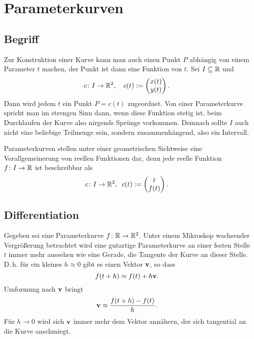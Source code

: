 \section{Parameterkurven}
\subsection{Begriff}
Zur Konstruktion einer Kurve kann man auch einen Punkt $P$ abhängig
von einem Parameter $t$ machen, der Punkt ist dann eine Funktion
von $t$. Sei $I\subseteq\mathbb R$ und%
\begin{equation}
c\colon I\to\mathbb R^2, \quad c(t):=\begin{pmatrix}x(t)\\ y(t)\end{pmatrix}.
\end{equation}
Dann wird jedem $t$ ein Punkt $P=c(t)$ zugeordnet. Von einer
Parameterkurve spricht man im strengen Sinn dann, wenn diese
Funktion stetig ist, beim Durchlaufen der Kurve also nirgends
Sprünge vorkommen. Demnach sollte $I$ auch nicht eine beliebige
Teilmenge sein, sondern zusammenhängend, also ein Intervall.

Parameterkurven stellen unter einer geometrischen Sichtweise eine
Verallgemeinerung von reellen Funktionen dar, denn jede reelle
Funktion $f\colon I\to\mathbb R$ ist beschreibbar als%
\begin{equation}
c\colon I\to \mathbb R^2,\;\; c(t):=\begin{pmatrix}t\\ f(t)\end{pmatrix}.
\end{equation}

\subsection{Differentiation}

Gegeben sei eine Parameterkurve $f\colon\mathbb R\to\mathbb R^2$. Unter einem
Mikroskop wachsender Vergrößerung betrachtet wird eine gutartige
Parameterkurve an einer festen Stelle $t$ immer mehr aussehen wie eine
Gerade, die Tangente der Kurve an dieser Stelle. D.\,h. für
ein kleines $h\approx 0$ gibt es einen Vektor $\mathbf{v}$, so dass%
\begin{equation}
f(t+h) \approx f(t)+h\mathbf{v}.
\end{equation}
Umformung nach $\mathbf{v}$ bringt
\begin{equation}
\mathbf{v} \approx \frac{f(t+h)-f(t)}{h}.
\end{equation}
Für $h\to 0$ wird sich $\mathbf{v}$ immer mehr dem Vektor annähern,
der sich tangential an die Kurve anschmiegt.

